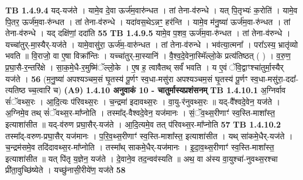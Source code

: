 \documentclass[17pt]{extarticle}
\begin{document}
                  \newline
                                \textbf{ TB 1.4.9.4} \newline
                  यद्-यज॑ते । यामे॒व दे॒वा ऊर्ज॑म॒वारु॑न्धत । तां तेना-व॑रुन्धे । यत् पि॒तृभ्यः॑ क॒रोति॑ । यामे॒व पि॒तर॒ ऊर्ज॑म॒वा-रु॑न्धत । तां तेना-व॑रुन्धे । यदा॑वस॒थेऽन्नꣳ॒॒ हर॑न्ति । यामे॒व म॑नु॒ष्या॑ ऊर्ज॑म॒वा-रु॑न्धत । तां तेना-व॑रुन्धे । यद् दक्षि॑णां॒ ददा॑ति \textbf{ 55} \newline
                  \newline
                                \textbf{ TB 1.4.9.5} \newline
                  यामे॒व प॒शव॒ ऊर्ज॑म॒वा-रु॑न्धत । तां तेना-व॑रुन्धे । यच्चा॑तुर्-मा॒स्यैर्-यज॑ते । यामे॒वासु॑रा॒ ऊर्ज॑म॒-वारु॑न्धत । तां तेना-व॑रुन्धे । भव॑त्या॒त्मना᳚ । परा᳚ऽस्य॒ भ्रातृ॑व्यो भवति ॥ वि॒राजो॒ वा ए॒षा विक्रा᳚न्तिः । यच्चा॑तुर्-मा॒स्यानि॑ । वै॒श्व॒दे॒वेना॒स्मिॅल्लो॒के प्रत्य॑तिष्ठत् ( ) । व॒रु॒ण॒ प्र॒घा॒सै-र॒न्तरि॑क्षे । सा॒क॒मे॒धै-र॒मुष्मि॑ॅल्लो॒के । ए॒ष ह॒ त्वावैतथ् सर्वं॑ भवति । य ए॒वं ॅवि॒द्वाꣳश्चा॑तुर्मा॒स्यैर् यज॑ते । \textbf{ 56} \newline
                  \newline
                                    (म॒नु॒ष्या॑ अपश्यञ्चम॒सं घृ॒तस्य॑ पू॒र्णꣳ स्व॒धा-मसु॑रा अपश्यञ्चम॒सं घृ॒तस्य॑ पू॒र्णꣳ स्व॒धा-मसु॑रा॒-ददा᳚-त्यतिष्ठ च्च॒त्वारि॑ च) \textbf{(A9)} \newline \newline
                \textbf{ 1.4.10    अनुवाकं   10 - चातुर्मास्यप्रशंसनम्} \newline
                                \textbf{ TB 1.4.10.1} \newline
                  अ॒ग्निर्वाव सं॑ॅवथ्स॒रः । आ॒दि॒त्यः प॑रिवथ्स॒रः । च॒न्द्रमा॑ इदावथ्स॒रः । वा॒यु-र॑नुवथ्स॒रः ॥ यद्-वै᳚श्वदे॒वेन॒ यज॑ते । अ॒ग्निमे॒व तथ् सं॑ॅवथ्स॒र-मा᳚प्नोति । तस्मा᳚द्-वैश्वदे॒वेन॒ यज॑मानः । सं॒ॅव॒थ्स॒रीणाꣳ॑ स्व॒स्ति-माशा᳚स्त॒ इत्याशा॑सीत ॥ यद्-व॑रुण प्रघा॒सैर्-यज॑ते । आ॒दि॒त्यमे॒व तत् प॑रिवथ्स॒र-मा᳚प्नोति \textbf{ 57} \newline
                  \newline
                                \textbf{ TB 1.4.10.2} \newline
                  तस्मा᳚द्-वरुण-प्रघा॒सैर् यज॑मानः । प॒रि॒व॒थ्स॒रीणाꣳ॑ स्व॒स्ति-माशा᳚स्त॒ इत्याशा॑सीत । यथ् सा॑कमे॒धैर्-यज॑ते । च॒न्द्रम॑समे॒व तदि॑दावथ्स॒र-मा᳚प्नोति । तस्मा᳚थ् साकमे॒धैर्-यज॑मानः । इ॒दा॒व॒थ्स॒रीणाꣳ॑ स्व॒स्ति-माशा᳚स्त॒ इत्याशा॑सीत ॥ यत् पि॑तृ य॒ज्ञेन॒ यज॑ते । दे॒वाने॒व तद॒न्वव॑स्यति ॥ अथ॒ वा अ॑स्य वा॒युश्चा॑-नुवथ्स॒रश्चा प्री॑ता॒वुच्छि॑ष्येते । यच्छु॑नासी॒रीये॑ण॒ यज॑ते \textbf{ 58} \newline
\end{document}
